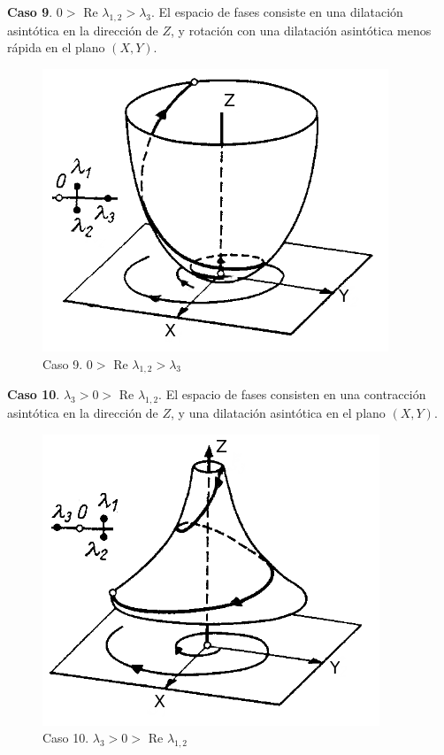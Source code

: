\documentclass[a4paper,10pt]{article}
\numberwithin{equation}{section}
\begin{document}
\textbf{Caso 9}. $0 > $ Re $\lambda_{1,2} > \lambda_3$. El espacio de fases consiste en una dilatación asintótica
en la dirección de $Z$, y rotación con una dilatación asintótica menos rápida en el plano $(X,Y)$.

\begin{figure}[h!]
 \centering
\includegraphics[scale=0.35]{problema3fig10}
\caption{Caso 9. $0 > $ Re $\lambda_{1,2} > \lambda_3$}
\label{fig:problema3fig10}
\end{figure}
\vspace{.3cm}

\textbf{Caso 10}. $\lambda_3 > 0 > $ Re $\lambda_{1,2}$. El espacio de fases consisten en una contracción asintótica
en la dirección de $Z$, y una dilatación asintótica en el plano $(X,Y)$.

\begin{figure}[h!]
 \centering
\includegraphics[scale=0.35]{problema3fig11}
\caption{Caso 10. $\lambda_3 > 0 > $ Re $\lambda_{1,2}$}
\label{fig:problema3fig11}
\end{figure}
\vspace{.3cm}
\end{document}
